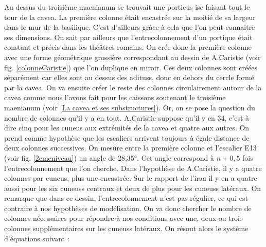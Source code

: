 Au dessus du troisième \gls{maenianum} se trouvait une \gls{porticus isc} faisant tout le tour de la \gls{cavea}. La première colonne était encastrée sur la moitié de sa largeur dans le mur de la basilique. C'est d'ailleurs grâce à cela que l'on peut connaitre ses dimensions. On sait par ailleurs que l'entrecolonnement d'un portique était constant et précis dans les théâtres romains. On crée donc la première colonne avec une forme géométrique grossière correspondant au dessin de A.Caristie (voir fig. \ref{colonneCaristie}) que l'on duplique en miroir. Ces deux colonnes sont créées séparément car elles sont au dessus des \glspl{aditus}, donc en dehors du cercle formé par la \gls{cavea}. On va ensuite créer le reste des colonnes circulairement autour de la \gls{cavea} comme nous l'avons fait pour les caissons soutenant le troisième \gls{maenianum} (voir \ref{La cavea et ses substructures}). Or, on se pose la question du nombre de colonnes qu'il y a en tout. A.Caristie suppose qu'il y en 34, c'est à dire cinq pour les \gls{cuneus} aux extrémités de la \gls{cavea} et quatre aux autres. On prend comme hypothèse que les escaliers arrivent toujours à égale distance de deux colonnes successives. On mesure entre la première colonne et l'escalier E13 (voir fig. \ref{2emeniveau}) un angle de 28,35°. Cet angle correspond à $n+0,5$ fois l'entrecolonnement que l'on cherche. Dans l'hypothèse de A.Caristie, il y a quatre colonnes par \gls{cuneus}, plus une encastrée. Sur le rapport de l'\gls{iraa} \cite[Pl. XX]{orangePl} il y en a quatre aussi pour les six \glspl{cuneus} centraux et deux de plus pour les \glspl{cuneus} latéraux. On remarque que dans ce dessin, l'entrecolonnement n'est pas régulier, ce qui est contraire à nos hypothèses de modélisation. On va donc chercher le nombre de colonnes nécessaires pour répondre à nos conditions avec une, deux ou trois colonnes supplémentaires sur les \glspl{cuneus} latéraux. On résout alors le système d'équations suivant :



